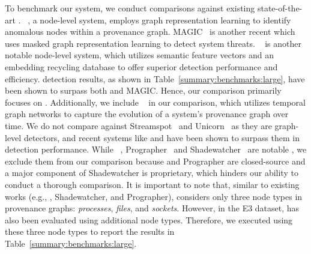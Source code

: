  To benchmark our system, we conduct comparisons against existing state-of-the-art \pids. \threatrace~\cite{wang2022threatrace}, a node-level system, employs graph representation learning to identify anomalous nodes within a provenance graph. MAGIC~\cite{jia2023magic} is another recent \pids which uses masked graph representation learning to detect system threats. \flash~\cite{flash2024} is another notable node-level system, which utilizes semantic feature vectors and an embedding recycling database to offer superior detection performance and efficiency. \flash detection results, as shown in Table~\ref{summary:benchmarks:large}, have been shown to surpass both \threatrace and MAGIC. Hence, our comparison primarily focuses on \flash. Additionally, we include \kairos~\cite{cheng2023kairos} in our comparison, which utilizes temporal graph networks to capture the evolution of a system's provenance graph over time. We do not compare against Streamspot~\cite{streamspot} and Unicorn~\cite{han2020unicorn} as they are graph-level detectors, and recent systems like \threatrace and \flash have been shown to surpass them in detection performance. While \disdet~\cite{dong2023distdet}, Prographer~\cite{yangprographer} and Shadewatcher~\cite{shadewatcher} are notable \pids, we exclude them from our comparison because \disdet and Prographer are closed-source and a major component of Shadewatcher is proprietary, which hinders our ability to conduct a thorough comparison. It is important to note that, similar to existing works (e.g., \kairos, Shadewatcher, and Prographer), \Sys considers only three node types in provenance graphs: \emph{processes}, \emph{files}, and \emph{sockets}. However, in the E3 dataset, \flash has also been evaluated using additional node types. Therefore, we executed \flash using these three node types to report the results in Table~\ref{summary:benchmarks:large}.

